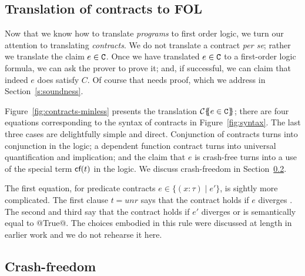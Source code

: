 
\subsection{Translation of contracts to FOL} \label{s:contracts-fol}

Now that we know how to translate \emph{programs} to first order
logic, we turn our attention to translating \emph{contracts}.  We do
not translate a contract \emph{per se}; rather we translate the claim
$e \in {\tt C}$.  Once we have translated $e \in {\tt C}$ to a first-order logic
formula, we can ask the prover to prove it; and, if successful, we can
claim that indeed $e$ does satisfy $C$.  Of course that needs proof,
which we address in Section~\ref{s:soundness}.

Figure~\ref{fig:contracts-minless} presents the translation
${\cal C}\{\!\!\{e \in {\tt C}\}\!\!\}$; there are four equations corresponding
to the syntax of contracts in Figure~\ref{fig:syntax}.
The last three cases are delightfully simple and direct.  Conjunction of contracts
turns into conjunction in the logic; a dependent function contract turns
into universal quantification and implication; and the claim that $e$ is
crash-free turns into a use of the special term $\textsf{cf}(t)$ in the logic.
We discuss crash-freedom in Section~\ref{s:cf-fol}.

The first equation, for predicate contracts $e \in \{(x{:}\tau) \mid e' \}$,
is sightly more complicated.
The first clause $t=unr$ says that the contract holds if $e$ diverges .
The second and third say that the contract holds if $e'$ diverges or is semantically
equal to @True@.  The choices embodied in this rule were discussed at length
in earlier work \cite{xu+:contracts} and we do not rehearse it here.

\subsection{Crash-freedom} \label{s:cf-fol}

